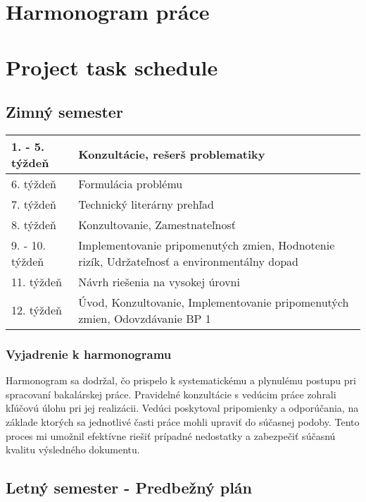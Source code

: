 \thispagestyle{empty}

\ifx\FIITlagEN\undefined
\chapter{Harmonogram práce}
\else
\chapter{Project task schedule}
\fi

\renewcommand*{\thepage}{B-\arabic{page}}

\section{Zimný semester}

\begin{tabular}{|p{3cm}||p{10.2cm}|}
\hline
1. - 5. týždeň    & Konzultácie, rešerš problematiky  \\
\hline
6. týždeň    & Formulácia problému \\
\hline
7. týždeň   & Technický literárny prehľad \\
\hline
8. týždeň                       & Konzultovanie, Zamestnateľnosť   \\
\hline
9. - 10. týždeň   & Implementovanie pripomenutých zmien,  Hodnotenie rizík, Udržateľnosť a environmentálny dopad  \\
\hline
11. týždeň  & Návrh riešenia na vysokej úrovni \\
\hline
12. týždeň & Úvod, Konzultovanie, Implementovanie pripomenutých zmien, Odovzdávanie BP 1 \\
\hline
\end{tabular}

\subsection{Vyjadrenie k harmonogramu}
\par{
Harmonogram sa dodržal, čo prispelo k systematickému a plynulému postupu pri spracovaní bakalárskej práce. Pravidelné konzultácie s vedúcim práce zohrali kľúčovú úlohu pri jej realizácii. Vedúci poskytoval pripomienky a odporúčania, na základe ktorých sa jednotlivé časti práce mohli upraviť do súčasnej podoby. Tento proces mi umožnil efektívne riešiť prípadné nedostatky a zabezpečiť súčasnú kvalitu výsledného dokumentu.
}

\section{Letný semester - Predbežný plán}

